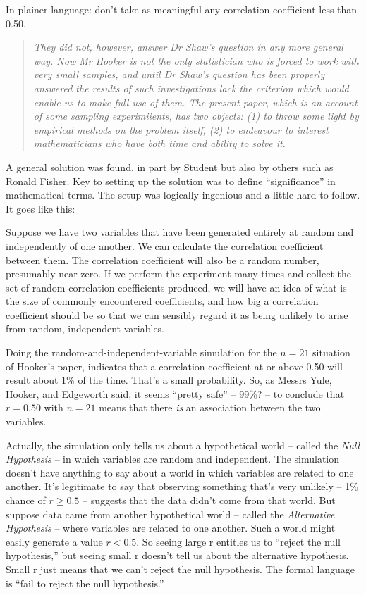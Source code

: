 \documentclass[]{book}
\begin{document}
In plainer language: don't take as meaningful any correlation coefficient less than 0.50.

\begin{quote}
\emph{They did not, however, answer Dr Shaw's question in any more general way. Now Mr Hooker is not the only statistician who is forced to work with very small samples, and until Dr Shaw's question has been properly answered the results of such investigations lack the criterion which would enable us to make full use of them. The present paper, which is an account of some sampling experimiients, has two objects: (1) to throw some light by empirical methods on the problem itself, (2) to endeavour to interest mathematicians who have both time and ability to solve it.}
\end{quote}

A general solution was found, in part by Student but also by others such as Ronald Fisher. Key to setting up the solution was to define ``significance'' in mathematical terms. The setup was logically ingenious and a little hard to follow. It goes like this:

Suppose we have two variables that have been generated entirely at random and independently of one another. We can calculate the correlation coefficient between them. The correlation coefficient will also be a random number, presumably near zero. If we perform the experiment many times and collect the set of random correlation coefficients produced, we will have an idea of what is the size of commonly encountered coefficients, and how big a correlation coefficient should be so that we can sensibly regard it as being unlikely to arise from random, independent variables.

Doing the random-and-independent-variable simulation for the \(n = 21\) situation of Hooker's paper, indicates that a correlation coefficient at or above 0.50 will result about 1\% of the time. That's a small probability. So, as Messrs Yule, Hooker, and Edgeworth said, it seems ``pretty safe'' -- 99\%? -- to conclude that \(r = 0.50\) with \(n=21\) means that there \emph{is} an association between the two variables.

Actually, the simulation only tells us about a hypothetical world -- called the \emph{Null Hypothesis} -- in which variables are random and independent. The simulation doesn't have anything to say about a world in which variables are related to one another. It's legitimate to say that observing something that's very unlikely -- 1\% chance of \(r \ge 0.5\) -- suggests that the data didn't come from that world. But suppose data came from another hypothetical world -- called the \emph{Alternative Hypothesis} -- where variables are related to one another. Such a world might easily generate a value \(r < 0.5\). So seeing large r entitles us to ``reject the null hypothesis,'' but seeing small r doesn't tell us about the alternative hypothesis. Small r just means that we can't reject the null hypothesis. The formal language is ``fail to reject the null hypothesis.''
\end{document}
